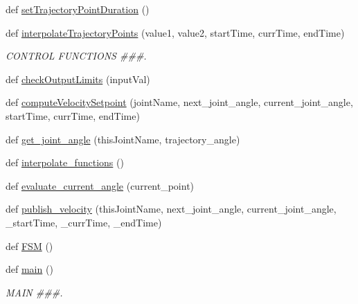 \begin{DoxyCompactItemize}
\item 
def \mbox{\hyperlink{namespacejoint__angle__velocity__factor__test_a8ccd55a57db9549655bb635bb0631dff}{set\+Trajectory\+Point\+Duration}} ()
\item 
def \mbox{\hyperlink{namespacejoint__angle__velocity__factor__test_a96be0e7e41607b97a26afe981b09f7eb}{interpolate\+Trajectory\+Points}} (value1, value2, start\+Time, curr\+Time, end\+Time)
\begin{DoxyCompactList}\small\item\em C\+O\+N\+T\+R\+OL F\+U\+N\+C\+T\+I\+O\+NS \#\#\#. \end{DoxyCompactList}\item 
def \mbox{\hyperlink{namespacejoint__angle__velocity__factor__test_a7f277f0054fee93e381fa7cc521e84b1}{check\+Output\+Limits}} (input\+Val)
\item 
def \mbox{\hyperlink{namespacejoint__angle__velocity__factor__test_a26a2f9375796bb26ff0160fd97507015}{compute\+Velocity\+Setpoint}} (joint\+Name, next\+\_\+joint\+\_\+angle, current\+\_\+joint\+\_\+angle, start\+Time, curr\+Time, end\+Time)
\item 
def \mbox{\hyperlink{namespacejoint__angle__velocity__factor__test_a95a904c83e1da11f17d2fd1270d87bdf}{get\+\_\+joint\+\_\+angle}} (this\+Joint\+Name, trajectory\+\_\+angle)
\item 
def \mbox{\hyperlink{namespacejoint__angle__velocity__factor__test_ae3a8f22ed862a16963f55dd37c335355}{interpolate\+\_\+functions}} ()
\item 
def \mbox{\hyperlink{namespacejoint__angle__velocity__factor__test_a5477dfc158501561a43ab3b829e0ad12}{evaluate\+\_\+current\+\_\+angle}} (current\+\_\+point)
\item 
def \mbox{\hyperlink{namespacejoint__angle__velocity__factor__test_ab606d4f2199d00da06c6035cce974ad4}{publish\+\_\+velocity}} (this\+Joint\+Name, next\+\_\+joint\+\_\+angle, current\+\_\+joint\+\_\+angle, \+\_\+start\+Time, \+\_\+curr\+Time, \+\_\+end\+Time)
\item 
def \mbox{\hyperlink{namespacejoint__angle__velocity__factor__test_a898aa5c136aa22dc5fdaea526a11075e}{F\+SM}} ()
\item 
def \mbox{\hyperlink{namespacejoint__angle__velocity__factor__test_ac92c8f49e7d1bffcde6d715e331beb5f}{main}} ()
\begin{DoxyCompactList}\small\item\em M\+A\+IN \#\#\#. \end{DoxyCompactList}\end{DoxyCompactItemize}
